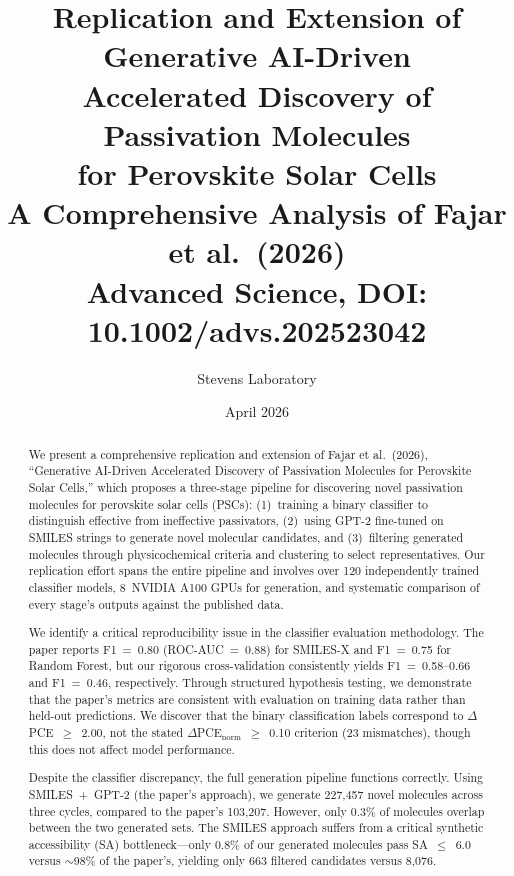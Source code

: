 \documentclass[11pt,a4paper]{article}
\title{\textbf{Replication and Extension of Generative AI-Driven\\
Accelerated Discovery of Passivation Molecules\\
for Perovskite Solar Cells}\\[12pt]
\large A Comprehensive Analysis of Fajar et al.\ (2026)\\
\normalsize Advanced Science, DOI: 10.1002/advs.202523042}
\author{Stevens Laboratory}
\date{April 2026}
\begin{document}
\maketitle
\thispagestyle{fancy}

\begin{abstract}
\noindent
We present a comprehensive replication and extension of Fajar et al.\ (2026), ``Generative AI-Driven Accelerated Discovery of Passivation Molecules for Perovskite Solar Cells,'' which proposes a three-stage pipeline for discovering novel passivation molecules for perovskite solar cells (PSCs): (1)~training a binary classifier to distinguish effective from ineffective passivators, (2)~using GPT-2 fine-tuned on SMILES strings to generate novel molecular candidates, and (3)~filtering generated molecules through physicochemical criteria and clustering to select representatives. Our replication effort spans the entire pipeline and involves over 120 independently trained classifier models, 8~NVIDIA A100 GPUs for generation, and systematic comparison of every stage's outputs against the published data.

We identify a critical reproducibility issue in the classifier evaluation methodology. The paper reports F1~=~0.80 (ROC-AUC~=~0.88) for SMILES-X and F1~=~0.75 for Random Forest, but our rigorous cross-validation consistently yields F1~=~0.58--0.66 and F1~=~0.46, respectively. Through structured hypothesis testing, we demonstrate that the paper's metrics are consistent with evaluation on training data rather than held-out predictions. We discover that the binary classification labels correspond to $\Delta$PCE~$\geq$~2.00, not the stated $\Delta$PCE$_\text{norm}$~$\geq$~0.10 criterion (23 mismatches), though this does not affect model performance.

Despite the classifier discrepancy, the full generation pipeline functions correctly. Using SMILES~+~GPT-2 (the paper's approach), we generate 227,457 novel molecules across three cycles, compared to the paper's 103,207. However, only 0.3\% of molecules overlap between the two generated sets. The SMILES approach suffers from a critical synthetic accessibility (SA) bottleneck---only 0.8\% of our generated molecules pass SA~$\leq$~6.0 versus $\sim$98\% of the paper's, yielding only 663 filtered candidates versus 8,076.


\end{abstract}
\end{document}
